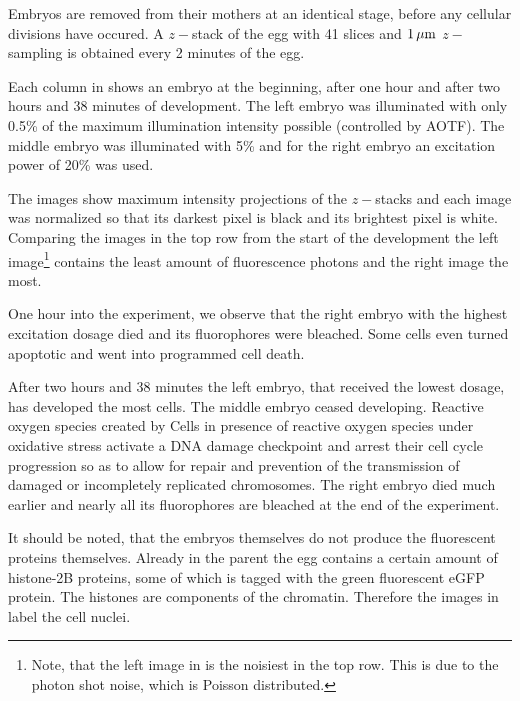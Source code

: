 Embryos are removed from their mothers at an identical stage, before    
any cellular divisions have occured. A $z-$stack of the egg with 41
slices and $\unit[1]{\mu m}$ $z-$sampling is obtained every 2 minutes
of the egg.

Each column in  shows an embryo at the     
beginning, after one hour and after two hours and 38 minutes of
development. The left embryo was illuminated with only 0.5\% of the
maximum illumination intensity possible (controlled by AOTF). The
middle embryo was illuminated with 5\% and for the right embryo an
excitation power of 20\% was used.

The images show maximum intensity projections of the $z-$stacks and     
each image was normalized so that its darkest pixel is black and its
brightest pixel is white. Comparing the images in the top row from the
start of the development the left image\footnote{Note, that the left
  image in  is the noisiest in the top
  row. This is due to the photon shot noise, which is Poisson
  distributed.} contains the least amount of fluorescence photons and
the right image the most.

One hour into the experiment, we observe that the right embryo with
the highest excitation dosage died and its fluorophores were bleached.
Some cells even turned apoptotic and went into programmed cell death.

After two hours and 38 minutes the left embryo, that received the
lowest dosage, has developed the most cells. The middle embryo ceased
developing. Reactive oxygen species created by Cells in presence of
reactive oxygen species under oxidative stress activate a DNA damage
checkpoint and arrest their cell cycle progression so as to allow for
repair and prevention of the transmission of damaged or incompletely
replicated chromosomes. The right embryo died much earlier and nearly
all its fluorophores are bleached at the end of the experiment.



It should be noted, that the embryos themselves do not produce the    
fluorescent proteins themselves. Already in the parent the egg
contains a certain amount of histone-2B proteins, some of which is
tagged with the green fluorescent eGFP protein. The histones are
components of the chromatin. Therefore the images in
 label the cell nuclei.

